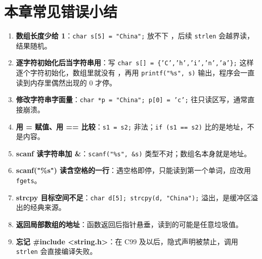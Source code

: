 \section{本章常见错误小结}
\begin{enumerate}
  \item \textbf{数组长度少给 1}：\texttt{char s[5] = "China";} 放不下 \nul，后续 \texttt{strlen} 会越界读，结果随机。
  \item \textbf{逐字符初始化后当字符串用}：写 \texttt{char s[] = \{'C','h','i','n','a'\};} 这样逐个字符初始化，数组里就没有 \nul，再用 \texttt{printf("\%s", s)} 输出，程序会一直读到内存里偶然出现的 0 才停。
  \item \textbf{修改字符串字面量}：\texttt{char *p = "China"; p[0] = 'c';} 往只读区写，通常直接崩溃。
  \item \textbf{用 = 赋值、用 == 比较}：\texttt{s1 = s2;} 非法；\texttt{if (s1 == s2)} 比的是地址，不是内容。
  \item \textbf{scanf 读字符串加 \&}：\texttt{scanf("\%s", \&s)} 类型不对；数组名本身就是地址。
  \item \textbf{scanf("\%s") 读含空格的一行}：遇空格即停，只能读到第一个单词，应改用 \texttt{fgets}。
  \item \textbf{strcpy 目标空间不足}：\texttt{char d[5]; strcpy(d, "China");} 溢出，是缓冲区溢出的经典来源。
  \item \textbf{返回局部数组的地址}：函数返回后指针悬垂，读到的可能是任意垃圾值。
  \item \textbf{忘记 \#include <string.h>}：在 C99 及以后，隐式声明被禁止，调用 \texttt{strlen} 会直接编译失败。
\end{enumerate}
